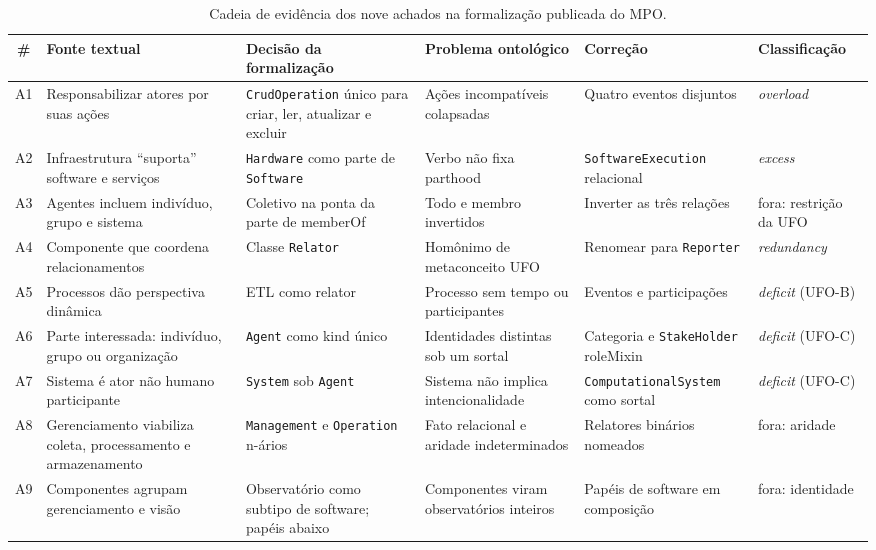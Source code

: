 \begin{table}[H]
\centering
\caption{Cadeia de evidência dos nove achados na formalização publicada do MPO.}
\label{tab:1}
\scriptsize
\setlength{\tabcolsep}{3pt}
\begin{tabularx}{\linewidth}{c>{\raggedright\arraybackslash\hsize=1.0369\hsize}X>{\raggedright\arraybackslash\hsize=0.8446\hsize}X>{\raggedright\arraybackslash\hsize=1.0395\hsize}X>{\raggedright\arraybackslash\hsize=1.2344\hsize}X>{\raggedright\arraybackslash\hsize=0.8446\hsize}X}
\hline
\textbf{\#} & \textbf{Fonte textual} & \textbf{Decisão da formalização} & \textbf{Problema ontológico} & \textbf{Correção} & \textbf{Classificação} \\
\hline
A1 & Responsabilizar atores por suas ações & \texttt{CrudOperation} único para criar, ler, atualizar e excluir & Ações incompatíveis colapsadas & Quatro eventos disjuntos & \textit{overload} \\
A2 & Infraestrutura ``suporta'' software e serviços & \texttt{Hardware} como parte de \texttt{Software} & Verbo não fixa parthood & \texttt{SoftwareExecution} relacional & \textit{excess} \\
A3 & Agentes incluem indivíduo, grupo e sistema & Coletivo na ponta da parte de \guillemotleft{}memberOf\guillemotright{} & Todo e membro invertidos & Inverter as três relações & fora: restrição da UFO \\
A4 & Componente que coordena relacionamentos & Classe \texttt{Relator} & Homônimo de metaconceito UFO & Renomear para \texttt{Reporter} & \textit{redundancy} \\
A5 & Processos dão perspectiva dinâmica & ETL como \guillemotleft{}relator\guillemotright{} & Processo sem tempo ou participantes & Eventos e participações & \textit{deficit} (UFO-B) \\
A6 & Parte interessada: indivíduo, grupo ou organização & \texttt{Agent} como \guillemotleft{}kind\guillemotright{} único & Identidades distintas sob um sortal & Categoria e \texttt{StakeHolder} \guillemotleft{}roleMixin\guillemotright{} & \textit{deficit} (UFO-C) \\
A7 & Sistema é ator não humano participante & \texttt{System} sob \texttt{Agent} & Sistema não implica intencionalidade & \texttt{ComputationalSystem} como sortal & \textit{deficit} (UFO-C) \\
A8 & Gerenciamento viabiliza coleta, processamento e armazenamento & \texttt{Management} e \texttt{Operation} n-ários & Fato relacional e aridade indeterminados & Relatores binários nomeados & fora: aridade \\
A9 & Componentes agrupam gerenciamento e visão & Observatório como subtipo de software; papéis abaixo & Componentes viram observatórios inteiros & Papéis de software em composição & fora: identidade \\
\hline
\end{tabularx}
\end{table}

